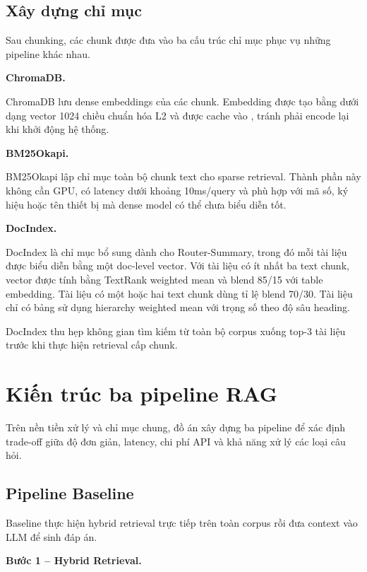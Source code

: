 \documentclass[../DoAn.tex]{subfiles}
\begin{document}
\subsection{Xây dựng chỉ mục}
\label{subsection:3.2.3}

Sau chunking, các chunk được đưa vào ba cấu trúc chỉ mục phục vụ những pipeline khác nhau.

\noindent\textbf{ChromaDB.}

ChromaDB lưu dense embeddings của các chunk. Embedding được tạo bằng  dưới dạng vector 1024 chiều chuẩn hóa L2 và được cache vào , tránh phải encode lại khi khởi động hệ thống.

\noindent\textbf{BM25Okapi.}

BM25Okapi lập chỉ mục toàn bộ chunk text cho sparse retrieval. Thành phần này không cần GPU, có latency dưới khoảng 10ms/query và phù hợp với mã số, ký hiệu hoặc tên thiết bị mà dense model có thể chưa biểu diễn tốt.

\noindent\textbf{DocIndex.}

DocIndex là chỉ mục bổ sung dành cho Router-Summary, trong đó mỗi tài liệu được biểu diễn bằng một doc-level vector. Với tài liệu có ít nhất ba text chunk, vector được tính bằng TextRank weighted mean và blend 85/15 với table embedding. Tài liệu có một hoặc hai text chunk dùng tỉ lệ blend 70/30. Tài liệu chỉ có bảng sử dụng hierarchy weighted mean với trọng số theo độ sâu heading.

DocIndex thu hẹp không gian tìm kiếm từ toàn bộ corpus xuống top-3 tài liệu trước khi thực hiện retrieval cấp chunk.

\section{Kiến trúc ba pipeline RAG}
\label{section:3.3}

Trên nền tiền xử lý và chỉ mục chung, đồ án xây dựng ba pipeline để xác định trade-off giữa độ đơn giản, latency, chi phí API và khả năng xử lý các loại câu hỏi.

\subsection{Pipeline Baseline}
\label{subsection:3.3.1}

Baseline thực hiện hybrid retrieval trực tiếp trên toàn corpus rồi đưa context vào LLM để sinh đáp án.

\noindent\textbf{Bước 1 -- Hybrid Retrieval.}
\end{document}
